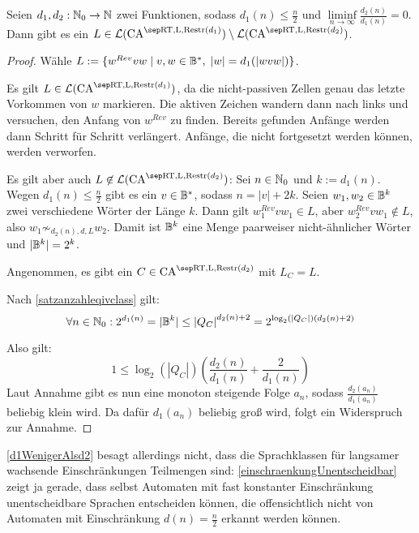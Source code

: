 \begin{satz}
    \label{d1WenigerAlsd2}
    Seien $d_1, d_2: \mathbb{N}_0 \to \mathbb{N}$ zwei Funktionen, sodass $d_1(n) \leq \frac{n}{2}$ und $\liminf\limits_{n \rightarrow \infty} \frac{d_2(n)}{d_1(n)} = 0$.
    Dann gibt es ein $L \in \CAL{\CART, \CALeft, \CARestr(d_1)} \setminus \CAL{\CART, \CALeft, \CARestr(d_2)}$.
\end{satz}
\begin{proof}
    Wähle $L := \{ { w^{Rev}vw } \; | \; { v, w \in \mathbb{B}^*, \; |w| = d_1(|wvw|) } \}$.
    
    Es gilt $L \in \CAL{\CART, \CALeft, \CARestr(d_1)}$, da die nicht-passiven Zellen genau das letzte Vorkommen von $w$ markieren.
    Die aktiven Zeichen wandern dann nach links und versuchen, den Anfang von $w^{Rev}$ zu finden.
    Bereits gefunden Anfänge werden dann Schritt für Schritt verlängert. Anfänge, die nicht fortgesetzt werden können, werden verworfen.

    Es gilt aber auch $L \not\in \CAL{\CART, \CALeft, \CARestr(d_2)}$:
    Sei $n \in \mathbb{N}_0$ und $k := d_1(n)$. Wegen $d_1(n) \leq \frac{n}{2}$ gibt es ein $v \in \mathbb{B}^*$, sodass $n = |v| + 2k$.
    Seien $w_1, w_2 \in \mathbb{B}^k$ zwei verschiedene Wörter der Länge $k$.
    Dann gilt $w_1^{Rev}vw_1 \in L$, aber $w_2^{Rev}vw_1 \not\in L$, also $w_1 \not\sim_{d_2(n),d,L} w_2$.
    Damit ist $\mathbb{B}^k$ eine Menge paarweiser nicht-ähnlicher Wörter und $|\mathbb{B}^k| = 2^k$.
    
    Angenommen, es gibt ein $C \in \CAM{\CART, \CALeft, \CARestr(d_2)}$ mit $L_C = L$.
    
    Nach \cref{satzanzahleqivclass} gilt:
    \[
        \forall n \in \mathbb{N}_0:  2^{d_1(n)} = |\mathbb{B}^k| \leq {|Q_C|}^{d_2(n)+2} = 2^{\log_2(|Q_C|)(d_2(n)+2)}
    \]
    
    Also gilt:
    \[
        1 \leq \log_2(|Q_C|) ( \frac{ d_2(n) }{ d_1(n) } + \frac{ 2 }{ d_1(n) })
    \]
    Laut Annahme gibt es nun eine monoton steigende Folge $a_n$, sodass $\frac{d_2(a_n)}{d_1(a_n)}$ beliebig klein wird.
    Da dafür $d_1(a_n)$ beliebig groß wird, folgt ein Widerspruch zur Annahme.
\end{proof}

\begin{remark}
    \cref{d1WenigerAlsd2} besagt allerdings nicht, dass die Sprachklassen für langsamer wachsende Einschränkungen Teilmengen sind:
    \cref{einschraenkungUnentscheidbar} zeigt ja gerade, dass selbst Automaten mit fast konstanter Einschränkung
    unentscheidbare Sprachen entscheiden können, die offensichtlich nicht von Automaten mit Einschränkung $d(n) = \frac{n}{2}$ erkannt werden können.
\end{remark}




